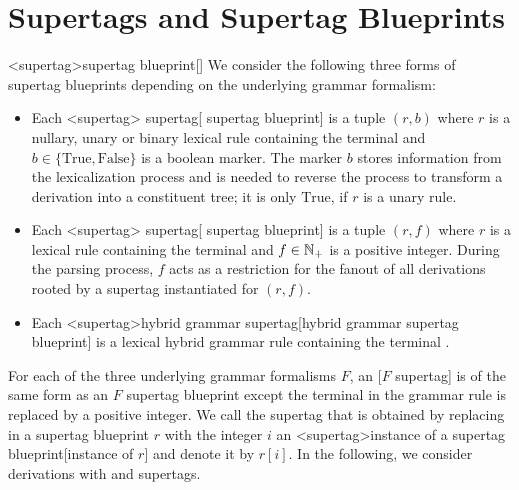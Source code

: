 \documentclass[../../document.tex]{subfiles}
\begin{document}
    \section{Supertags and Supertag Blueprints}\label{sec:supertags}<supertag>{supertag blueprint}[]
    We consider the following three forms of supertag blueprints depending on the underlying grammar formalism:
    \begin{itemize}
        \item
            Each <supertag>{ supertag}[ supertag blueprint] is a tuple \((r, b)\) where \(r\) is a nullary, unary or binary lexical  rule containing the terminal \wildcard{} and \(b \in \{\text{True}, \text{False}\}\) is a boolean marker.
            The marker \(b\) stores information from the lexicalization process and is needed to reverse the process to transform a derivation into a constituent tree; it is only \(\text{True}\), if \(r\) is a unary rule.
        \item
            Each <supertag>{ supertag}[ supertag blueprint] is a tuple \((r, f)\) where \(r\) is a lexical  rule containing the terminal \wildcard{} and \(f \in \mathbb{N}_+\) is a positive integer.
            During the parsing process, \(f\) acts as a restriction for the fanout of all derivations rooted by a supertag instantiated for \((r,f)\).
        \item Each <supertag>{hybrid grammar supertag}[hybrid grammar supertag blueprint] is a lexical hybrid grammar rule containing the terminal \wildcard{}.
    \end{itemize}
    For each of the three underlying grammar formalisms \(F\), an [\(F\) supertag] is of the same form as an \(F\) supertag blueprint except the terminal \wildcard{} in the grammar rule is replaced by a positive integer.
    We call the supertag that is obtained by replacing \wildcard{} in a supertag blueprint \(r\) with the integer \(i\) an <supertag>{instance of a supertag blueprint}[instance of \(r\)] and denote it by \(r[i]\).
    In the following, we consider derivations with  and  supertags.
\end{document}
